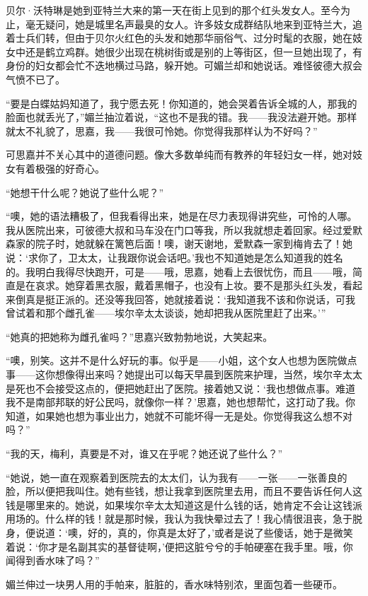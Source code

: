 \par 贝尔·沃特琳是她到亚特兰大来的第一天在街上见到的那个红头发女人。至今为止，毫无疑问，她是城里名声最臭的女人。许多妓女成群结队地来到亚特兰大，追着士兵们转，但由于贝尔火红色的头发和她那华丽俗气、过分时髦的衣服，她在妓女中还是鹤立鸡群。她很少出现在桃树街或是别的上等街区，但一旦她出现了，有身份的妇女都会忙不迭地横过马路，躲开她。可媚兰却和她说话。难怪彼德大叔会气愤不已了。
\par “要是白蝶姑妈知道了，我宁愿去死！你知道的，她会哭着告诉全城的人，那我的脸面也就丢光了，”媚兰抽泣着说，“这也不是我的错。我——我没法避开她。那样就太不礼貌了，思嘉，我——我很可怜她。你觉得我那样认为不好吗？”
\par 可思嘉并不关心其中的道德问题。像大多数单纯而有教养的年轻妇女一样，她对妓女有着极强的好奇心。
\par “她想干什么呢？她说了些什么呢？”
\par “噢，她的语法糟极了，但我看得出来，她是在尽力表现得讲究些，可怜的人哪。我从医院出来，可彼德大叔和马车没在门口等我，所以我就想走着回家。经过爱默森家的院子时，她就躲在篱笆后面！噢，谢天谢地，爱默森一家到梅肯去了！她说：‘求你了，卫太太，让我跟你说会话吧。’我也不知道她是怎么知道我的姓名的。我明白我得尽快跑开，可是——哦，思嘉，她看上去很忧伤，而且——哦，简直是在哀求。她穿着黑衣服，戴着黑帽子，也没有上妆。要不是那头红头发，看起来倒真是挺正派的。还没等我回答，她就接着说：‘我知道我不该和你说话，可我曾试着和那个雌孔雀——埃尔辛太太谈谈，她却把我从医院里赶了出来。'”
\par “她真的把她称为雌孔雀吗？”思嘉兴致勃勃地说，大笑起来。
\par “噢，别笑。这并不是什么好玩的事。似乎是——小姐，这个女人也想为医院做点事——这你想像得出来吗？她提出可以每天早晨到医院来护理，当然，埃尔辛太太是死也不会接受这点的，便把她赶出了医院。接着她又说：‘我也想做点事。难道我不是南部邦联的好公民吗，就像你一样？’思嘉，她也想帮忙，这打动了我。你知道，如果她也想为事业出力，她就不可能坏得一无是处。你觉得我这么想不对吗？”
\par “我的天，梅利，真要是不对，谁又在乎呢？她还说了些什么？”
\par “她说，她一直在观察着到医院去的太太们，认为我有——一张——一张善良的脸，所以便把我叫住。她有些钱，想让我拿到医院里去用，而且不要告诉任何人这钱是哪里来的。她说，如果埃尔辛太太知道这是什么钱的话，她肯定不会让这钱派用场的。什么样的钱！就是那时候，我认为我快晕过去了！我心情很沮丧，急于脱身，便说道：‘噢，好的，真的，你真是太好了，’或者是说了些傻话，她于是微笑着说：‘你才是名副其实的基督徒啊，’便把这脏兮兮的手帕硬塞在我手里。哦，你闻得到香水味了吗？”
\par 媚兰伸过一块男人用的手帕来，脏脏的，香水味特别浓，里面包着一些硬币。

